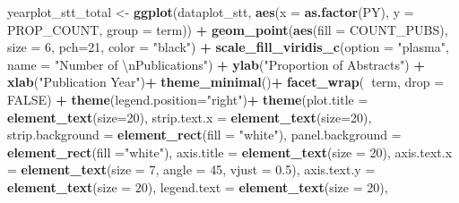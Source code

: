 \documentclass[
]{article}
\newenvironment{Shaded}{\begin{snugshade}}{\end{snugshade}}
\newcommand{\CharTok}[1]{\textcolor[rgb]{0.31,0.60,0.02}{#1}}
\newcommand{\DataTypeTok}[1]{\textcolor[rgb]{0.13,0.29,0.53}{#1}}
\newcommand{\DecValTok}[1]{\textcolor[rgb]{0.00,0.00,0.81}{#1}}
\newcommand{\FloatTok}[1]{\textcolor[rgb]{0.00,0.00,0.81}{#1}}
\newcommand{\KeywordTok}[1]{\textcolor[rgb]{0.13,0.29,0.53}{\textbf{#1}}}
\newcommand{\NormalTok}[1]{#1}
\newcommand{\OperatorTok}[1]{\textcolor[rgb]{0.81,0.36,0.00}{\textbf{#1}}}
\newcommand{\OtherTok}[1]{\textcolor[rgb]{0.56,0.35,0.01}{#1}}
\newcommand{\StringTok}[1]{\textcolor[rgb]{0.31,0.60,0.02}{#1}}
\begin{document}
\begin{Shaded}
\begin{Highlighting}[]
\NormalTok{yearplot_stt_total <-}\StringTok{  }\KeywordTok{ggplot}\NormalTok{(dataplot_stt, }
                              \KeywordTok{aes}\NormalTok{(}\DataTypeTok{x =} \KeywordTok{as.factor}\NormalTok{(PY), }\DataTypeTok{y =}\NormalTok{ PROP_COUNT, }
                                  \DataTypeTok{group =}\NormalTok{ term)) }\OperatorTok{+}
\StringTok{  }\KeywordTok{geom_point}\NormalTok{(}\KeywordTok{aes}\NormalTok{(}\DataTypeTok{fill =}\NormalTok{ COUNT_PUBS), }\DataTypeTok{size =} \DecValTok{6}\NormalTok{, }\DataTypeTok{pch=}\DecValTok{21}\NormalTok{, }\DataTypeTok{color =} \StringTok{"black"}\NormalTok{) }\OperatorTok{+}
\StringTok{  }\KeywordTok{scale_fill_viridis_c}\NormalTok{(}\DataTypeTok{option =} \StringTok{"plasma"}\NormalTok{, }
                       \DataTypeTok{name =} \StringTok{"Number of }\CharTok{\textbackslash{}n}\StringTok{Publications"}\NormalTok{) }\OperatorTok{+}
\StringTok{  }\KeywordTok{ylab}\NormalTok{(}\StringTok{"Proportion of Abstracts"}\NormalTok{) }\OperatorTok{+}\StringTok{ }
\StringTok{  }\KeywordTok{xlab}\NormalTok{(}\StringTok{"Publication Year"}\NormalTok{)}\OperatorTok{+}
\StringTok{  }\KeywordTok{theme_minimal}\NormalTok{()}\OperatorTok{+}
\StringTok{  }\KeywordTok{facet_wrap}\NormalTok{(}\OperatorTok{~}\NormalTok{term, }\DataTypeTok{drop =} \OtherTok{FALSE}\NormalTok{) }\OperatorTok{+}
\StringTok{  }\KeywordTok{theme}\NormalTok{(}\DataTypeTok{legend.position=}\StringTok{"right"}\NormalTok{)}\OperatorTok{+}
\StringTok{  }\KeywordTok{theme}\NormalTok{(}\DataTypeTok{plot.title =} \KeywordTok{element_text}\NormalTok{(}\DataTypeTok{size=}\DecValTok{20}\NormalTok{),}
        \DataTypeTok{strip.text.x =} \KeywordTok{element_text}\NormalTok{(}\DataTypeTok{size=}\DecValTok{20}\NormalTok{),}
        \DataTypeTok{strip.background =} \KeywordTok{element_rect}\NormalTok{(}\DataTypeTok{fill =} \StringTok{"white"}\NormalTok{),}
        \DataTypeTok{panel.background =} \KeywordTok{element_rect}\NormalTok{(}\DataTypeTok{fill =}\StringTok{"white"}\NormalTok{),}
        \DataTypeTok{axis.title =} \KeywordTok{element_text}\NormalTok{(}\DataTypeTok{size =} \DecValTok{20}\NormalTok{),}
        \DataTypeTok{axis.text.x =} \KeywordTok{element_text}\NormalTok{(}\DataTypeTok{size =} \DecValTok{7}\NormalTok{, }\DataTypeTok{angle =} \DecValTok{45}\NormalTok{, }\DataTypeTok{vjust =} \FloatTok{0.5}\NormalTok{),}
        \DataTypeTok{axis.text.y =} \KeywordTok{element_text}\NormalTok{(}\DataTypeTok{size =} \DecValTok{20}\NormalTok{),}
        \DataTypeTok{legend.text =} \KeywordTok{element_text}\NormalTok{(}\DataTypeTok{size =} \DecValTok{20}\NormalTok{),}

\end{Highlighting}
\end{Shaded}
\end{document}
